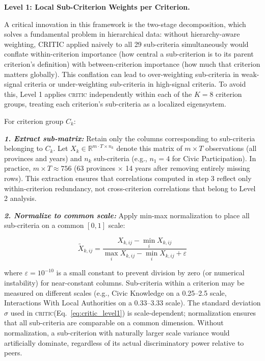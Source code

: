 \documentclass[12pt,a4paper]{article}
\newcommand{\CRITIC}{\textsc{critic}\xspace}
\begin{document}
\textbf{Level 1: Local Sub-Criterion Weights per Criterion.} 

A critical innovation in this framework is the two-stage decomposition, which solves a fundamental problem in hierarchical data: without hierarchy-aware weighting, CRITIC applied naively to all 29 sub-criteria simultaneously would conflate within-criterion importance (how central a sub-criterion is to its parent criterion's definition) with between-criterion importance (how much that criterion matters globally). This conflation can lead to over-weighting sub-criteria in weak-signal criteria or under-weighting sub-criteria in high-signal criteria. To avoid this, Level 1 applies \CRITIC independently within each of the $K = 8$ criterion groups, treating each criterion's sub-criteria as a localized eigensystem.

For criterion group $C_k$:

\textit{\textbf{1. Extract sub-matrix:}} Retain only the columns corresponding to sub-criteria belonging to $C_k$. Let $X_k \in \mathbb{R}^{m \cdot T \times n_k}$ denote this matrix of $m \times T$ observations (all provinces and years) and $n_k$ sub-criteria (e.g., $n_1 = 4$ for Civic Participation). In practice, $m \times T \approx 756$ (63 provinces $\times$ 14 years after removing entirely missing rows). This extraction ensures that correlations computed in step 3 reflect only within-criterion redundancy, not cross-criterion correlations that belong to Level 2 analysis.

\textit{\textbf{2. Normalize to common scale:}} Apply min-max normalization to place all sub-criteria on a common $[0, 1]$ scale:

\begin{equation}
\label{eq:minmax_norm}
\tilde{X}_{k,ij} = \frac{X_{k,ij} - \min_i X_{k,ij}}{\max_i X_{k,ij} - \min_i X_{k,ij} + \varepsilon}
\end{equation}

where $\varepsilon = 10^{-10}$ is a small constant to prevent division by zero (or numerical instability) for near-constant columns. Sub-criteria within a criterion may be measured on different scales (e.g., Civic Knowledge on a 0.25--2.5 scale, Interactions With Local Authorities on a 0.33--3.33 scale). The standard deviation $\sigma$ used in \CRITIC (Eq.~\eqref{eq:critic_level1}) is scale-dependent; normalization ensures that all sub-criteria are comparable on a common dimension. Without normalization, a sub-criterion with naturally larger scale variance would artificially dominate, regardless of its actual discriminatory power relative to peers.
\end{document}
